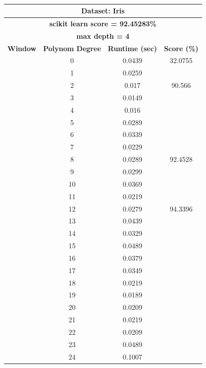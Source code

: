 \documentclass{article}
\begin{document}
\begin{multicols}{2}
\begin{table}[H]
\caption{}
\label{tab:my-table}
\begin{tabular}{|c|c|c|c|}
\hline
\multicolumn{4}{|c|}{\textbf{Dataset: Iris}} \\ \hline
\multicolumn{4}{|c|}{\textbf{scikit learn score = 92.45283\%}} \\ \hline
\multicolumn{4}{|c|}{\textbf{max depth = 4}} \\ \hline
\textbf{Window} & \textbf{Polynom Degree} & \textbf{Runtime (sec)} & \textbf{Score (\%)} \\ \hline
 & 0 & 0.0439 & 32.0755 \\ \cline{2-4} 
 & 1 & 0.0259 &  \\ \cline{2-3}
 & 2 & 0.017 & \multirow{-2}{*}{90.566} \\ \cline{2-4} 
 & 3 & 0.0149 &  \\ \cline{2-3}
 & 4 & 0.016 &  \\ \cline{2-3}
 & 5 & 0.0289 &  \\ \cline{2-3}
 & 6 & 0.0339 &  \\ \cline{2-3}
 & 7 & 0.0229 &  \\ \cline{2-3}
 & 8 & 0.0289 & \multirow{-6}{*}{92.4528} \\ \cline{2-4} 
 & \cellcolor[HTML]{FFFFC7}9 & \cellcolor[HTML]{FFFFC7}0.0299 & \cellcolor[HTML]{FFFFC7} \\ \cline{2-3}
 & 10 & 0.0369 & \cellcolor[HTML]{FFFFC7} \\ \cline{2-3}
 & 11 & 0.0219 & \cellcolor[HTML]{FFFFC7} \\ \cline{2-3}
 & 12 & 0.0279 & \multirow{-4}{*}{\cellcolor[HTML]{FFFFC7}94.3396} \\ \cline{2-4} 
 & 13 & 0.0439 &  \\ \cline{2-3}
 & 14 & 0.0329 &  \\ \cline{2-3}
 & 15 & 0.0489 &  \\ \cline{2-3}
 & 16 & 0.0379 &  \\ \cline{2-3}
 & 17 & 0.0349 &  \\ \cline{2-3}
 & 18 & 0.0219 &  \\ \cline{2-3}
 & 19 & 0.0189 &  \\ \cline{2-3}
 & 20 & 0.0209 &  \\ \cline{2-3}
 & 21 & 0.0219 &  \\ \cline{2-3}
 & 22 & 0.0209 &  \\ \cline{2-3}
 & 23 & 0.0489 &  \\ \cline{2-3}
 & 24 & 0.1007 &  \\ \cline{2-3}

\end{tabular}
\end{table}
\end{multicols}
\end{document}
